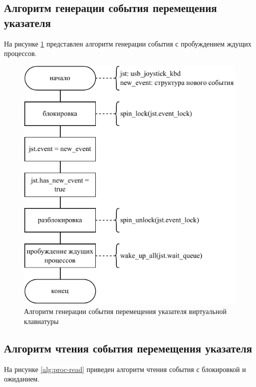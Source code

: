 \clearpage

\subsection{Алгоритм генерации события перемещения указателя}

На рисунке \ref{alg:emit-event} представлен алгоритм генерации события с пробуждением ждущих процессов.

\begin{figure}[ht]
    \centering
    \includegraphics[keepaspectratio,width=0.75\linewidth,height=0.85\textheight]{img/emit-event.pdf}
    \caption{Алгоритм генерации события перемещения указателя виртуальной клавиатуры}
    \label{alg:emit-event}
\end{figure}

\subsection{Алгоритм чтения события перемещения указателя}

На рисунке \ref{alg:proc-read} приведен алгоритм чтения события с блокировкой и ожиданием.

